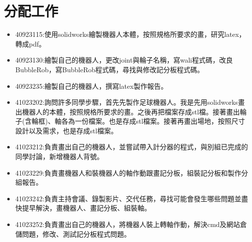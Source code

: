 \chapter{分配工作}
\begin{itemize}
\item 40923115:使用solidworks繪製機器人本體，按照規格所要求的畫，研究latex，轉成pdf。
\item 40923130:繪製自己的機器人，更改joint與輪子名稱，寫wali程式碼，改良BubbleRob，寫BubbleRob程式碼，尋找與修改記分板程式碼。
\item 40923235:繪製自己的機器人，撰寫latex製作報告。
\item 41023202:詢問許多同學步驟，首先先製作足球機器人。我是先用solidworks畫出機器人的本體，按照規格所要求的畫。之後再把檔案存成stl檔。接著畫出輪子(含輪框)、軸各為一份檔案。也是存成stl檔案。接著再畫出場地，按照尺寸設計以及需求，也是存成stl檔案。 
\item 41023212:負責畫出自己的機器人，並嘗試帶入計分器的程式，與別組已完成的同學討論，新增機器人背號。 
\item 41023229:負責畫機器人和裝機器人的軸作動跟畫記分板，組裝記分板和製作分組報告。
\item 41023242:負責主持會議、錄製影片、交代任務，尋找可能會發生哪些問題並盡快提早解決，畫機器人、畫記分板、組裝軸。
\item 41023252:負責畫出自己的機器人，將機器人裝上轉軸作動，解決cmd及網站倉儲問題，修改、測試記分板程式問題。
\end{itemize}
\newpage
